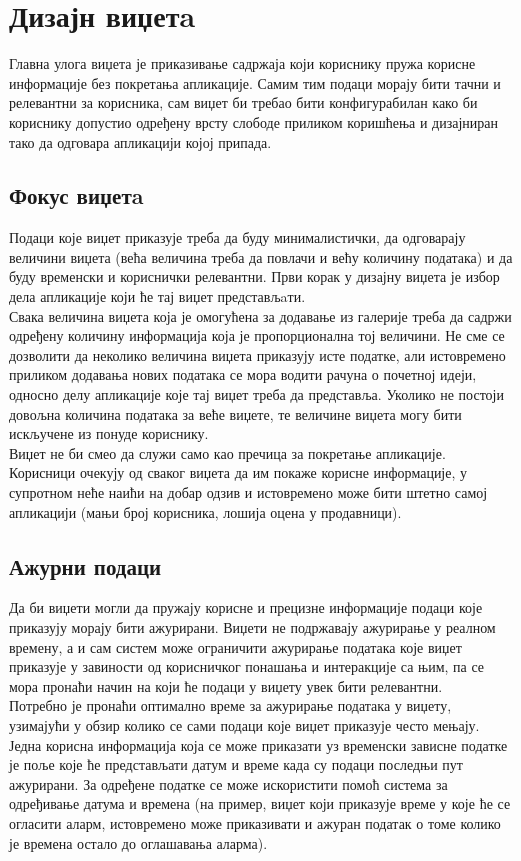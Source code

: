\documentclass[12pt,oneside]{memoir}
\begin{document}
\section{Дизајн виџетa}
\label{sec:Дизајн виџетa}

\indent Главна улога виџета је приказивање садржаја који кориснику пружа корисне информације без покретања апликације. Самим тим подаци морају бити тачни и релевантни за корисника, сам виџет би требао бити конфигурабилан како би кориснику допустио одређену врсту слободе приликом коришћења и дизајниран тако да одговара апликацији којој припада.

\subsection{Фокус виџетa}
\indent  Подаци које виџет приказује треба да буду минималистички, да одговарају величини виџета (већа величина треба да повлачи и већу количину података) и да буду временски и кориснички релевантни. Први корак у дизајну виџета је избор дела апликације који ће тај виџет представљaти. 
\\
\indent Свака величина виџета која је омогућена за додавање из галерије треба да садржи одређену количину информација која је пропорционална тој величини. Не сме се дозволити да неколико величина виџета приказују исте податке, али истовремено приликом додавања нових података се мора водити рачуна о почетној идеји, односно делу апликације које тај виџет треба да представља. Уколико не постоји довољна количина података за веће виџете, те величине виџета могу бити искључене из понуде кориснику.
\\
\indent Виџет не би смео да служи само као пречица за покретање апликације. Корисници очекују од сваког виџета да им покаже корисне информације, у супротном неће наићи на добар одзив и истовремено може бити штетно самој апликацији (мањи број корисника, лошија оцена у продавници).

\subsection{Ажурни подаци}
\indent Да би виџети могли да пружају корисне и прецизне информације подаци које приказују морају бити ажурирани. Виџети не подржавају ажурирање у реалном времену, а и сам систем може ограничити ажурирање података које виџет приказује у завиности од корисничког понашања и интеракције са њим, па се мора пронаћи начин на који ће подаци у виџету увек бити релевантни. 
\\
\indent Потребно је пронаћи оптимално време за ажурирање података у виџету, узимајући у обзир колико се сами подаци које виџет приказује често мењају. Једна корисна информација која се може приказати уз временски зависне податке је поље које ће представљати датум и време када су подаци последњи пут ажурирани. За одређене податке се може искористити помоћ система за одређивање датума и времена (на пример, виџет који приказује време у које ће се огласити аларм, истовремено може приказивати и ажуран податак о томе колико је времена остало до оглашавања аларма).
\end{document}
